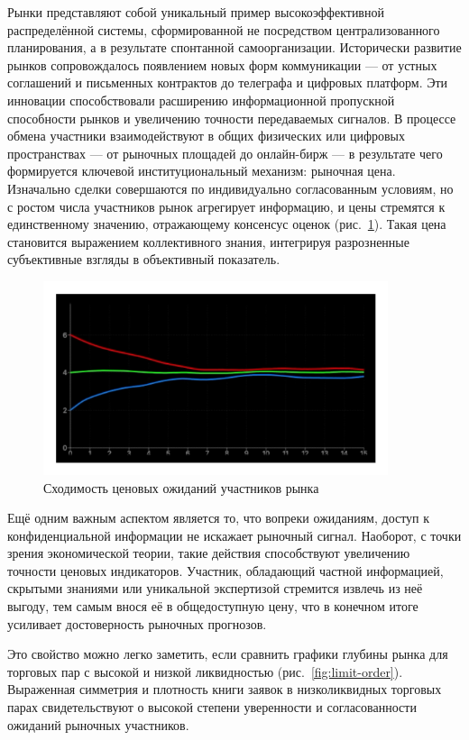 \documentclass[
    14pt,
    specialist,
    candidate, %
    subf, %
    href,
    dotsinheaders=false
]{disser}
\begin{document}
Рынки представляют собой уникальный пример высокоэффективной распределённой системы, сформированной не посредством централизованного планирования, а в результате спонтанной самоорганизации. Исторически развитие рынков сопровождалось появлением новых форм коммуникации — от устных соглашений и письменных контрактов до телеграфа и цифровых платформ. Эти инновации способствовали расширению информационной пропускной способности рынков и увеличению точности передаваемых сигналов. В процессе обмена участники взаимодействуют в общих физических или цифровых пространствах — от рыночных площадей до онлайн-бирж — в результате чего формируется ключевой институциональный механизм: рыночная цена. Изначально сделки совершаются по индивидуально согласованным условиям, но с ростом числа участников рынок агрегирует информацию, и цены стремятся к единственному значению, отражающему консенсус оценок (рис.~\ref{fig:one-price}). Такая цена становится выражением коллективного знания, интегрируя разрозненные субъективные взгляды в объективный показатель.

\begin{figure}[h]
  \centering
  \includegraphics[width=0.9\textwidth]{./assets/one-price.png}
  \caption{Сходимость ценовых ожиданий участников рынка}
  \label{fig:one-price}
\end{figure}

Ещё одним важным аспектом является то, что вопреки ожиданиям, доступ к конфиденциальной информации не искажает рыночный сигнал. Наоборот, с точки зрения экономической теории, такие действия способствуют увеличению точности ценовых индикаторов. Участник, обладающий частной информацией, скрытыми знаниями или уникальной экспертизой стремится извлечь из неё выгоду, тем самым внося её в общедоступную цену, что в конечном итоге усиливает достоверность рыночных прогнозов.

Это свойство можно легко заметить, если сравнить графики глубины рынка для торговых пар с высокой и низкой ликвидностью (рис.~\ref{fig:limit-order}). Выраженная симметрия и плотность книги заявок в низколиквидных торговых парах свидетельствуют о высокой степени уверенности и согласованности ожиданий рыночных участников.
\end{document}
